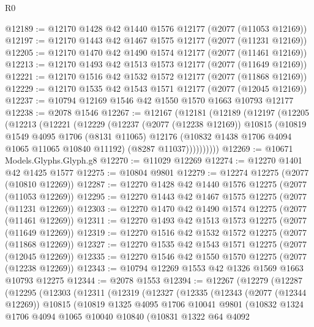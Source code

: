 \begin{lexlean}{R0}
\begin{coremodule}
@12189 := @12170 @1428 @42 @1440 @1576 @12177 (@2077 (@11053 @12169))
@12197 := @12170 @1443 @42 @1467 @1575 @12177 (@2077 (@11231 @12169))
@12205 := @12170 @1470 @42 @1490 @1574 @12177 (@2077 (@11461 @12169))
@12213 := @12170 @1493 @42 @1513 @1573 @12177 (@2077 (@11649 @12169))
@12221 := @12170 @1516 @42 @1532 @1572 @12177 (@2077 (@11868 @12169))
@12229 := @12170 @1535 @42 @1543 @1571 @12177 (@2077 (@12045 @12169))
@12237 := @10794 @12169 @1546 @42 @1550 @1570 @1663 @10793 @12177
@12238 := @2078 @1546
@12267 := @12167
    (@12181
      (@12189
        (@12197
          (@12205
            (@12213
              (@12221
                (@12229
                  (@12237
                    (@2077 (@12238 @12169))
                    @10815
                    (@10819
                      @1549
                      @4095
                      @1706
                      (@8131 @11065)
                      @12176
                      (@10832 @1438 @1706 @4094 @1065 @11065 @10840 @11192)
                      (@8287 @11037))))))))))
@12269 := @10671 Models.Glyphs.Glyph.g8
@12270 := @11029 @12269
@12274 := @12270 @1401 @42 @1425 @1577
@12275 := @10804 @9801
@12279 := @12274 @12275 (@2077 (@10810 @12269))
@12287 := @12270 @1428 @42 @1440 @1576 @12275 (@2077 (@11053 @12269))
@12295 := @12270 @1443 @42 @1467 @1575 @12275 (@2077 (@11231 @12269))
@12303 := @12270 @1470 @42 @1490 @1574 @12275 (@2077 (@11461 @12269))
@12311 := @12270 @1493 @42 @1513 @1573 @12275 (@2077 (@11649 @12269))
@12319 := @12270 @1516 @42 @1532 @1572 @12275 (@2077 (@11868 @12269))
@12327 := @12270 @1535 @42 @1543 @1571 @12275 (@2077 (@12045 @12269))
@12335 := @12270 @1546 @42 @1550 @1570 @12275 (@2077 (@12238 @12269))
@12343 := @10794 @12269 @1553 @42 @1326 @1569 @1663 @10793 @12275
@12344 := @2078 @1553
@12394 := @12267
    (@12279
      (@12287
        (@12295
          (@12303
            (@12311
              (@12319
                (@12327
                  (@12335
                    (@12343
                      (@2077 (@12344 @12269))
                      @10815
                      (@10819
                        @1325
                        @4095
                        @1706
                        @10041
                        @9801
                        (@10832
                          @1324
                          @1706
                          @4094
                          @1065
                          @10040
                          @10840
                          (@10831
                            @1322
                            @64
                            @4092

\end{coremodule}
\end{lexlean}
